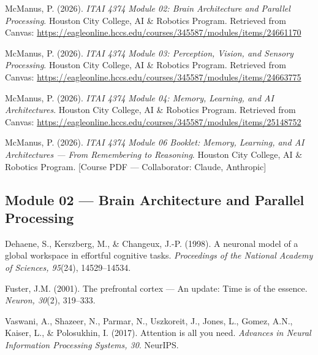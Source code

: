 \documentclass[12pt, a4paper]{article}
\begin{document}
\begin{enumerate}[leftmargin=0.4in, label={[\arabic*]}]

\item McManus, P. (2026). \textit{ITAI 4374 Module 02: Brain Architecture and Parallel Processing}. Houston City College, AI \& Robotics Program. Retrieved from Canvas: \url{https://eagleonline.hccs.edu/courses/345587/modules/items/24661170}

\item McManus, P. (2026). \textit{ITAI 4374 Module 03: Perception, Vision, and Sensory Processing}. Houston City College, AI \& Robotics Program. Retrieved from Canvas: \url{https://eagleonline.hccs.edu/courses/345587/modules/items/24663775}

\item McManus, P. (2026). \textit{ITAI 4374 Module 04: Memory, Learning, and AI Architectures}. Houston City College, AI \& Robotics Program. Retrieved from Canvas: \url{https://eagleonline.hccs.edu/courses/345587/modules/items/25148752}

\item McManus, P. (2026). \textit{ITAI 4374 Module 06 Booklet: Memory, Learning, and AI Architectures — From Remembering to Reasoning}. Houston City College, AI \& Robotics Program. [Course PDF — Collaborator: Claude, Anthropic]

\end{enumerate}

\subsection*{Module 02 — Brain Architecture and Parallel Processing}

\begin{enumerate}[leftmargin=0.4in, label={[\arabic*]}, resume]

\item Dehaene, S., Kerszberg, M., \& Changeux, J.-P. (1998). A neuronal model of a global workspace in effortful cognitive tasks. \textit{Proceedings of the National Academy of Sciences, 95}(24), 14529--14534.

\item Fuster, J.M. (2001). The prefrontal cortex — An update: Time is of the essence. \textit{Neuron, 30}(2), 319--333.

\item Vaswani, A., Shazeer, N., Parmar, N., Uszkoreit, J., Jones, L., Gomez, A.N., Kaiser, L., \& Polosukhin, I. (2017). Attention is all you need. \textit{Advances in Neural Information Processing Systems, 30}. NeurIPS.

\end{enumerate}
\end{document}
